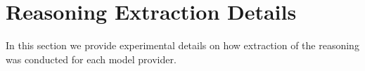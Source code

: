 \section{Reasoning Extraction Details}
In this section we provide experimental details on how extraction of the reasoning was conducted for each model provider. 

\label{app:extraction_details}



\clearpage


\clearpage


\clearpage

